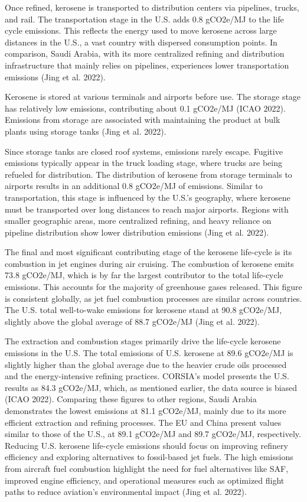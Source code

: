 \documentclass[12pt]{article}
\begin{document}
\begin{Appendix}
Once refined, kerosene is transported to distribution centers via pipelines, trucks, and rail. The transportation stage in the U.S. adds 0.8 gCO2e/MJ to the life cycle emissions. This reflects the energy used to move kerosene across large distances in the U.S., a vast country with dispersed consumption points. In comparison, Saudi Arabia, with its more centralized refining and distribution infrastructure that mainly relies on pipelines, experiences lower transportation emissions (Jing et al. 2022).

Kerosene is stored at various terminals and airports before use. The storage stage has relatively low emissions, contributing about 0.1 gCO2e/MJ (ICAO 2022). Emissions from storage are associated with maintaining the product at bulk plants using storage tanks (Jing et al. 2022).

Since storage tanks are closed roof systems, emissions rarely escape. Fugitive emissions typically appear in the truck loading stage, where trucks are being refueled for distribution.
The distribution of kerosene from storage terminals to airports results in an additional 0.8 gCO2e/MJ of emissions. Similar to transportation, this stage is influenced by the U.S.'s geography, where kerosene must be transported over long distances to reach major airports. Regions with smaller geographic areas, more centralized refining, and heavy reliance on pipeline distribution show lower distribution emissions (Jing et al. 2022).

The final and most significant contributing stage of the kerosene life-cycle is its combustion in jet engines during air cruising. The combustion of kerosene emits 73.8 gCO2e/MJ, which is by far the largest contributor to the total life-cycle emissions. This accounts for the majority of greenhouse gases released. This figure is consistent globally, as jet fuel combustion processes are similar across countries. The U.S. total well-to-wake emissions for kerosene stand at 90.8 gCO2e/MJ, slightly above the global average of 88.7 gCO2e/MJ (Jing et al. 2022).

The extraction and combustion stages primarily drive the life-cycle kerosene emissions in the U.S. The total emissions of U.S. kerosene at 89.6 gCO2e/MJ is slightly higher than the global average due to the heavier crude oils processed and the energy-intensive refining practices. CORSIA’s model presents the U.S. results as 84.3 gCO2e/MJ, which, as mentioned earlier, the data source is biased (ICAO 2022). Comparing these figures to other regions, Saudi Arabia demonstrates the lowest emissions at 81.1 gCO2e/MJ, mainly due to its more efficient extraction and refining processes. The EU and China present values similar to those of the U.S., at 89.1 gCO2e/MJ and 89.7 gCO2e/MJ, respectively. Reducing U.S. kerosene life-cycle emissions should focus on improving refinery efficiency and exploring alternatives to fossil-based jet fuels. The high emissions from aircraft fuel combustion highlight the need for fuel alternatives like SAF, improved engine efficiency, and operational measures such as optimized flight paths to reduce aviation's environmental impact (Jing et al. 2022).


\end{Appendix}
\end{document}
